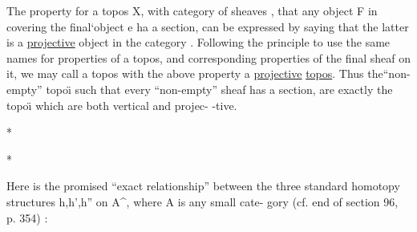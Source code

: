 
The property  for a topos X, with category of sheaves , that
any object F in   covering the final`object e  ha a section,
can be expressed by saying that the latter is a \uline{projective} object in
the category . Following the principle to use the same names for
properties of a topos, and corresponding properties of the final
sheaf on it, we may call a topos with the above property a \uline{projective}
\uline{topos}. Thus the``non-empty'' topo\"{\i} such that every ``non-empty'' sheaf 
has a section, are exactly the topo\"{\i} which are both vertical and projec-%
-tive.

* \quad *

*

Here is the promised ``exact relationship'' between the three
standard homotopy structures h,h',h'' on A\^{}, where A is any small cate-%
gory (cf. end of section 96, p. 354) :


